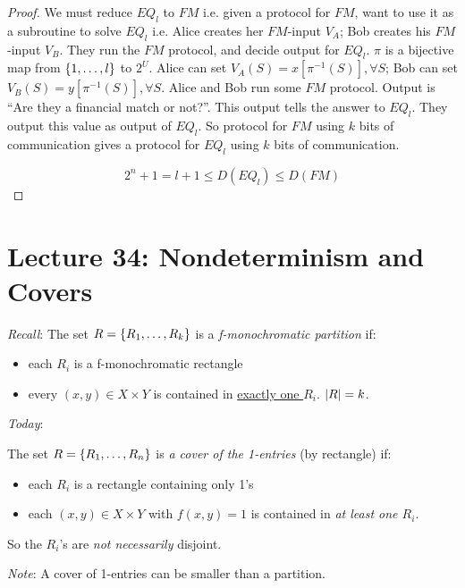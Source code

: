 \begin{proof}
    We must reduce $EQ_l$ to $FM$ i.e. given a protocol for $FM$, want to use it as a subroutine to solve $EQ_l$ i.e. Alice creates her $FM$-input $V_A$; Bob creates his $FM$-input $V_B$. They run the $FM$ protocol, and decide output for $EQ_l$. $\pi$ is a bijective map from $\left \{ 1, \ldots, l \right \}$ to $2^U$. Alice can set $V_A(S) = x[\pi^{-1}(S)], \forall S$; Bob can set $V_B(S) = y[\pi^{-1}(S)], \forall S$. Alice and Bob run some $FM$ protocol. Output is ``Are they a financial match or not?''. This output tells the answer to $EQ_l$. They output this value as output of $EQ_l$. So protocol for $FM$ using $k$ bits of communication gives a protocol for $EQ_l$ using $k$ bits of communication.

    \begin{equation*}
        2^n + 1 = l + 1 \leq D(EQ_l) \leq D(FM)
    \end{equation*}
\end{proof}

\section*{Lecture 34: Nondeterminism and Covers}

\emph{Recall}: The set $R = \left \{ R_1, \ldots, R_k \right \}$ is a \emph{f-monochromatic partition} if:

\begin{itemize}
    \item  each $R_i$ is a f-monochromatic rectangle
    \item every $(x, y) \in X \times Y$ is contained in \underline{exactly one $R_i$}. $\left | R \right | = k$.
\end{itemize}

\emph{Today}:

\begin{definition}
    The set $R = \left \{ R_1, \ldots, R_n \right \}$ is \emph{a cover of the 1-entries} (by rectangle) if:

    \begin{itemize}
        \item each $R_i$ is a rectangle containing only 1's
        \item each $(x, y) \in X \times Y$ with $f(x, y) = 1$ is contained in \emph{at least one $R_i$}.
    \end{itemize}

    So the $R_i$'s are \emph{not necessarily} disjoint.
\end{definition}

\emph{Note}: A cover of 1-entries can be smaller than a partition.

